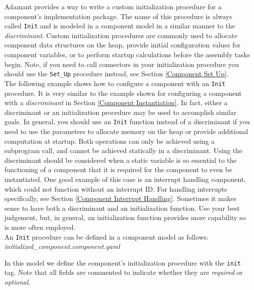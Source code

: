 Adamant provides a way to write a custom initialization procedure for a component's implementation package. The name of this procedure is always called \texttt{Init} and is modeled in a component model in a similar manner to the \textit{discriminant}. Custom initialization procedures are commonly used to allocate component data structures on the heap, provide initial configuration values for component variables, or to perform startup calculations before the assembly tasks begin. Note, if you need to call connectors in your initialization procedure you should use the \texttt{Set\_Up} procedure instead, see Section \ref{Component Set Up}. \\

The following example shows how to configure a component with an \texttt{Init} procedure. It is very similar to the example shown for configuring a component with a \textit{discriminant} in Section \ref{Component Instantiation}. In fact, either a discriminant or an initialization procedure may be used to accomplish similar goals. In general, you should use an \texttt{Init} function instead of a discriminant if you need to use the parameters to allocate memory on the heap or provide additional computation at startup. Both operations can only be achieved using a subprogram call, and cannot be achieved statically in a discriminant. Using the discriminant should be considered when a static variable is so essential to the functioning of a component that it is required for the component to even be instantiated. One good example of this case is an interrupt handling component, which could not function without an interrupt ID. For handling interrupts specifically, see Section \ref{Component Interrupt Handling}. Sometimes it makes sense to have both a discriminant and an initialization function. Use your best judgement, but, in general, an initialization function provides more capability so is more often employed. \\

An \texttt{Init} procedure can be defined in a component model as follows: \\

\textit{initialized\_component.component.yaml}

In this model we define the component's initialization procedure with the \texttt{init} tag. Note that all fields are commented to indicate whether they are \textit{required} or \textit{optional}. \\

